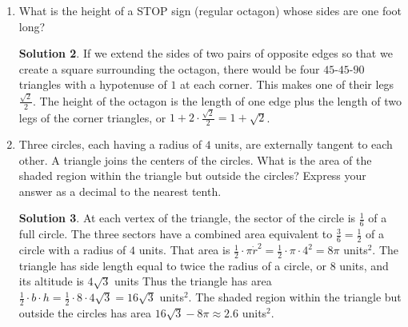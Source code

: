 \documentclass{article}
\theoremstyle{definition}
\newtheorem*{solution}{Solution}
\begin{document}
\begin{multicols}{2}
\begin{enumerate}
\begin{solution}
                This means it's area is $\frac{\pi}{27}$, so the ratio between the area of the small circle and the area of the large circle is $\frac{1}{27}$.
            \end{solution}
        \item What is the height of a STOP sign (regular octagon) whose sides are one foot long?
            \begin{solution}
                If we extend the sides of two pairs of opposite edges so that we create a square surrounding the octagon, there would be four $45$-$45$-$90$ triangles with a hypotenuse of $1$ at each corner.
                This makes one of their legs $\frac{\sqrt{2}}{2}$.
                The height of the octagon is the length of one edge plus the length of two legs of the corner triangles, or $1 + 2 \cdot \frac{\sqrt{2}}{2} = 1 + \sqrt{2}$.
            \end{solution}
        \item Three circles, each having a radius of $4$ units, are externally tangent to each other.
            A triangle joins the centers of the circles.
            What is the area of the shaded region within the triangle but outside the circles?
            Express your answer as a decimal to the nearest tenth.
            \begin{center}
            \end{center}
            \begin{solution}
                At each vertex of the triangle, the sector of the circle is $\frac{1}{6}$ of a full circle.
                The three sectors have a combined area equivalent to $\frac{3}{6} = \frac{1}{2}$ of a circle with a radius of $4$ units.
                That area is $\frac{1}{2} \cdot \pi \dot r^2 = \frac{1}{2} \cdot \pi \cdot 4^2 = 8\pi$ units$^2$.
                The triangle has side length equal to twice the radius of a circle, or $8$ units, and its altitude is $4\sqrt{3}$ units
                Thus the triangle has area $\frac{1}{2} \cdot b \cdot h = \frac{1}{2} \cdot 8 \cdot 4\sqrt{3} = 16\sqrt{3}$ units$^2$.
                The shaded region within the triangle but outside the circles has area $16\sqrt{3} - 8\pi \approx 2.6$ units$^2$.
            \end{solution}
    \end{enumerate}
\end{multicols}
\end{document}
